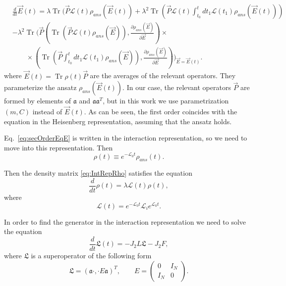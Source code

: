 \documentclass[12pt]{article}
\theoremstyle{definition}
\newcommand\Tr{\operatorname{Tr}}
\newcommand{\mf}[1]{\mathfrak{#1}}
\def\la {\lambda}
\begin{document}
	\begin{align}
		&\frac{d}{dt} \vec{E}(t) = \lambda   \Tr ( \vec{P}\mathcal{L}(t)\rho_{ans} (\vec{E}(t) ) + \lambda^2 \Tr \left( \vec{P} \mathcal{L}(t)  \int_{t_0}^t dt_1 \mathcal{L}(t_1)\rho_{ans} (\vec{E}(t))   \right) \nonumber \\
		& 	-  \lambda^2 \Tr\Biggl( \vec{P} \left(\Tr (  \vec{P} \mathcal{L}(t)\rho_{ans} (\vec{E}) ) , \frac{\partial \rho_{ans}(\vec{E})}{\partial \vec{E}} \right) \times \nonumber\\
		& \qquad \times \left(\Tr (  \vec{P}\int_{t_0}^t dt_1\mathcal{L}(t_1)\rho_{ans} (\vec{E}) )  , \frac{\partial \rho_{ans}(\vec{E})}{\partial \vec{E}} \right) \Biggr)_{\vec{E} =\vec{E}(t) }. \label{eq:secOrderEqE}
	\end{align}
	where $\vec{E}(t) = \Tr\rho(t)\vec{P}$ are the averages of the relevant operators. They parameterize the ansatz $ \rho_{ans} (\vec{E}(t) ) $. In our case, the relevant operators $ \vec{P} $ are formed by elements of $\mf{a} $ and $ \mf{a} \mf{a}^T $, but in this work we use parametrization $ (m,C) $ instead of $ \vec{E}(t) $.	As can be seen, the first order coincides with the equation in the Heisenberg representation, assuming that the ansatz holds. 
	
	Eq.~\eqref{eq:secOrderEqE} is written in the interaction representation, so we need to move into this representation. Then
	\begin{equation}
		\label{eq:IntRepRho}
		\rho(t) \equiv e^{-\mathcal{L}_0t}\rho_{ans}(t).
	\end{equation}
	
	Then the density matrix \eqref{eq:IntRepRho} satisfies the equation 
	\begin{equation}
		\label{eq:MainEq}
		\dfrac{d}{dt}\rho(t) = \la\mathcal{L}(t)\rho(t),
	\end{equation}
	where
	\begin{equation}
		\label{eq:IntRepL}
		\mathcal{L}(t) = e^{-\mathcal{L}_0t}\mathcal{L}_ie^{\mathcal{L}_0t}.
	\end{equation}
	
	In order to find the generator in the interaction representation we need to  solve the equation
	\begin{equation}
		\label{eq:InteractionReprSuper}
		\dfrac{d}{dt}\mathfrak{L}(t) = -J_2L\mathfrak{L}-J_2F,
	\end{equation}
	where $\mf{L}$ is a superoperator of the following form
	\begin{equation*}
		\mathfrak{L} = (\mathfrak{a}\cdot,\cdot E\mathfrak{a})^T, \qquad 	E = \begin{pmatrix}
			0 & I_N \\
			I_N & 0
		\end{pmatrix}.
	\end{equation*}
	
\end{document}
